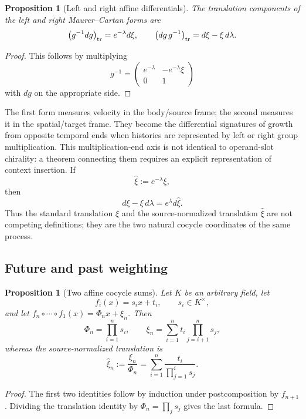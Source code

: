 \documentclass[11pt]{article}
\newtheorem{proposition}[theorem]{Proposition}
\theoremstyle{definition}
\theoremstyle{remark}
\begin{document}
\begin{proposition}[Left and right affine differentials]
The translation components of the left and right Maurer--Cartan forms are
\[
\bigl(g^{-1}dg\bigr)_{\rm tr}=e^{-\lambda}d\xi,
\qquad
\bigl(dg\,g^{-1}\bigr)_{\rm tr}=d\xi-\xi\,d\lambda.
\]
\end{proposition}

\begin{proof}
This follows by multiplying
\[
g^{-1}=
\begin{pmatrix}
e^{-\lambda}&-e^{-\lambda}\xi\\0&1
\end{pmatrix}
\]
with \(dg\) on the appropriate side.
\end{proof}

The first form measures velocity in the body/source frame; the second measures
it in the spatial/target frame.  They become the differential signatures of
growth from opposite temporal ends when histories are represented by left or
right group multiplication.  This multiplication-end axis is not identical
to operand-slot chirality: a theorem connecting them requires an explicit
representation of context insertion.  If
\[
\widehat\xi:=e^{-\lambda}\xi,
\]
then
\[
d\xi-\xi\,d\lambda=e^\lambda d\widehat\xi.
\]
Thus the standard translation \(\xi\) and the source-normalized translation
\(\widehat\xi\) are not competing definitions; they are the two natural
cocycle coordinates of the same process.

\subsection{Future and past weighting}

\begin{proposition}[Two affine cocycle sums]
Let \(K\) be an arbitrary field, let
\[
f_i(x)=s_i x+t_i,\qquad s_i\in K^\times,
\]
and let \(f_n\circ\cdots\circ f_1(x)=\Phi_nx+\xi_n\).  Then
\[
\Phi_n=\prod_{i=1}^n s_i,
\qquad
\xi_n=\sum_{i=1}^n t_i\prod_{j=i+1}^n s_j,
\]
whereas the source-normalized translation is
\[
\widehat\xi_n:=\frac{\xi_n}{\Phi_n}
=\sum_{i=1}^n\frac{t_i}{\prod_{j=1}^i s_j}.
\]
\end{proposition}

\begin{proof}
The first two identities follow by induction under postcomposition by
\(f_{n+1}\).  Dividing the translation identity by
\(\Phi_n=\prod_js_j\) gives the last formula.
\end{proof}
\end{document}
